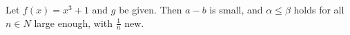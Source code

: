 \documentclass{article}
\begin{document}
Let $f(x) = x^3 + 1$ and $g$ be given. Then \(a-b\) is small,
and $\alpha \le \beta$ holds for all $n \in N$ large enough, with $\frac{1}{n}$ new.
\end{document}
